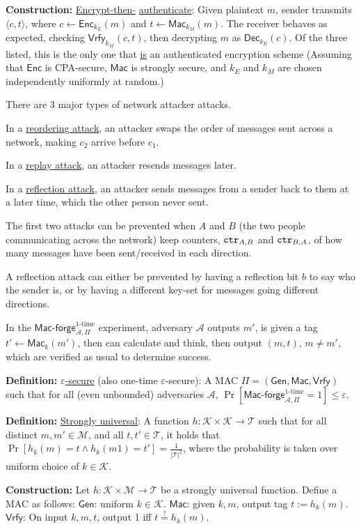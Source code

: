 \documentclass[10pt]{article}
\newcommand{\AAA}{\mathcal{A}}
\newcommand{\KKK}{\mathcal{K}}
\newcommand{\MMM}{\mathcal{M}}
\newcommand{\TTT}{\mathcal{T}}
\newcommand{\defn}[1]{{\bf Definition:} \underline{#1}}
\newcommand{\con}[1]{{\bf Construction:} \underline{#1}}
\newcommand{\Enc}{\mathsf{Enc}}
\newcommand{\Dec}{\mathsf{Dec}}
\newcommand{\Mac}{\mathsf{Mac}}
\newcommand{\Macf}{\mathsf{Mac\text{-}forge}}
\newcommand{\Vrfy}{\mathsf{Vrfy}}
\newcommand{\Gen}{\mathsf{Gen}}
\newcommand{\ang}[1]{\langle#1\rangle}
\newcommand{\GenMacVrfy}{(\Gen,\Mac,\Vrfy)}
\newcommand{\ctr}{{\tt ctr}}
\newcommand{\from}{\leftarrow}
\begin{document}
\begin{multicols}{4}
\con{Encrypt-then-} \underline{authenticate}: Given plaintext $m$, sender transmits $\ang{c,t}$, where $c\from\Enc_{k_E}(m)$ and $t\from\Mac_{k_M}(m)$. The receiver behaves as expected, checking $\Vrfy_{k_M}(c,t)$, then decrypting $m$ as $\Dec_{k_E}(c)$. Of the three listed, this is the only one that \underline{is} an authenticated encryption scheme (Assuming that $\Enc$ is CPA-secure, $\Mac$ is strongly secure, and $k_E$ and $k_M$ are chosen independently uniformly at random.)

There are 3 major types of network attacker attacks.

In a \underline{reordering attack}, an attacker swaps the order of messages sent across a network, making $c_2$ arrive before $c_1$.

In a \underline{replay attack}, an attacker resends messages later.

In a \underline{reflection attack}, an attacker sends messages from a sender back to them at a later time, which the other person never sent.

The first two attacks can be prevented when $A$ and $B$ (the two people communicating across the network) keep counters, $\ctr_{A,B}$ and $\ctr_{B,A}$, of how many messages have been sent/received in each direction.

A reflection attack can either be prevented by having a reflection bit $b$ to say who the sender is, or by having a different key-set for messages going different directions.

In the $\Macf_{\AAA,\Pi}^{\text{1-time}}$ experiment, adversary $\AAA$ outputs $m'$, is given a tag $t'\from\Mac_k(m')$, then can calculate and think, then output $(m,t)$, $m\neq m'$, which are verified as usual to determine success.

\defn{$\varepsilon$-secure} (also one-time $\varepsilon$-secure): A MAC $\Pi=\GenMacVrfy$ such that for all (even unbounded) adversaries $\AAA$, $\Pr[\Macf_{\AAA,\Pi}^{\text{1-time}}=1]\leq\varepsilon$.

\defn{Strongly universal}: A function $h:\KKK\times\KKK\to\TTT$ such that for all distinct $m,m'\in\MMM$, and all $t,t'\in\TTT$, it holds that $\Pr[h_k(m)=t\wedge h_k(m1)=t']=\frac{1}{|\TTT|^2}$, where the probability is taken over uniform choice of $k\in\KKK$.

\con{}Let $h:\KKK\times\MMM\to\TTT$ be a strongly universal function. Define a MAC as follows: $\Gen$: uniform $k\in\KKK$. $\Mac$: given $k,m$, output tag $t:=h_k(m)$. $\Vrfy$: On input $k,m,t$, output 1 iff $t\overset{?}{=}h_k(m)$.


\end{multicols}
\end{document}
